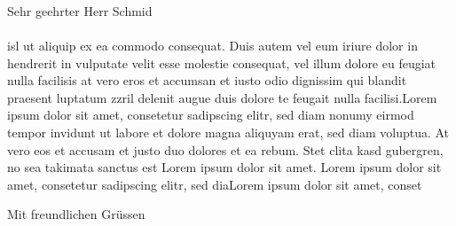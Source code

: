 \documentclass[a4paper,12pt]{letter}
\begin{document}
\thispagestyle{fancy}
\renewcommand{\headrulewidth}{0pt}
\parbox[t][20mm]{50mm}{\from \\\\ \fromtel} \\
\par\vspace{10mm}
\parbox[b][15mm]{90mm}{\fromdate}

\par 
\textbf{}

Sehr geehrter Herr Schmid \\\\
isl ut aliquip ex ea commodo consequat. Duis autem vel eum iriure dolor in hendrerit in vulputate velit esse molestie consequat, vel illum dolore eu feugiat nulla facilisis at vero eros et accumsan et iusto odio dignissim qui blandit praesent luptatum zzril delenit augue duis dolore te feugait nulla facilisi.Lorem ipsum dolor sit amet, consetetur sadipscing elitr, sed diam nonumy eirmod tempor invidunt ut labore et dolore magna aliquyam erat, sed diam voluptua. At vero eos et accusam et justo duo dolores et ea rebum. Stet clita kasd gubergren, no sea takimata sanctus est Lorem ipsum dolor sit amet. Lorem ipsum dolor sit amet, consetetur sadipscing elitr, sed diaLorem ipsum dolor sit amet, conset
\vspace{10mm}
\par\hspace{90mm}Mit freundlichen Grüssen
\par\vspace{15mm}\hspace{90mm}\fromname
\end{document}
